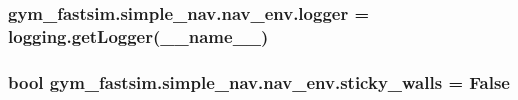 \subsubsection[{\texorpdfstring{logger}{logger}}]{\setlength{\rightskip}{0pt plus 5cm}gym\+\_\+fastsim.\+simple\+\_\+nav.\+nav\+\_\+env.\+logger = logging.\+get\+Logger(\+\_\+\+\_\+name\+\_\+\+\_\+)}\hypertarget{namespacegym__fastsim_1_1simple__nav_1_1nav__env_a8c1f8057ea69598dc1111abc7dfec26a}{}\label{namespacegym__fastsim_1_1simple__nav_1_1nav__env_a8c1f8057ea69598dc1111abc7dfec26a}
\subsubsection[{\texorpdfstring{sticky\+\_\+walls}{sticky_walls}}]{\setlength{\rightskip}{0pt plus 5cm}bool gym\+\_\+fastsim.\+simple\+\_\+nav.\+nav\+\_\+env.\+sticky\+\_\+walls = False}\hypertarget{namespacegym__fastsim_1_1simple__nav_1_1nav__env_a8c908c673c55d7c283ae108d1bf8a665}{}\label{namespacegym__fastsim_1_1simple__nav_1_1nav__env_a8c908c673c55d7c283ae108d1bf8a665}

